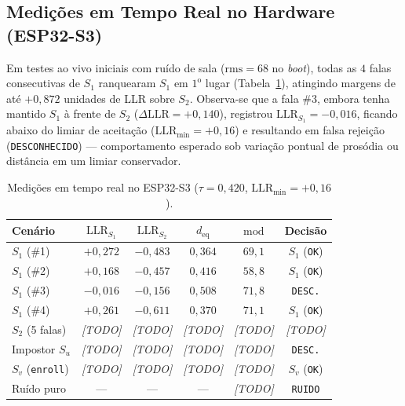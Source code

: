 \documentclass[9pt,technote,a4paper]{IEEEtran}
\begin{document}
\subsection{Medições em Tempo Real no Hardware (ESP32-S3)}
Em testes ao vivo iniciais com ruído de sala ($\mathrm{rms} = 68$ no \textit{boot}), todas as $4$ falas consecutivas de $S_1$ ranquearam $S_1$ em $1^\text{o}$ lugar (Tabela~\ref{tab:live_esp}), atingindo margens de até $+0{,}872$ unidades de LLR sobre $S_2$. Observa-se que a fala \#3, embora tenha mantido $S_1$ à frente de $S_2$ ($\Delta\mathrm{LLR} = +0{,}140$), registrou $\mathrm{LLR}_{S_1} = -0{,}016$, ficando abaixo do limiar de aceitação ($\mathrm{LLR}_{\min} = +0{,}16$) e resultando em falsa rejeição (\texttt{DESCONHECIDO}) --- comportamento esperado sob variação pontual de prosódia ou distância em um limiar conservador.

\begin{table}[t]
\centering
\scriptsize
\setlength{\tabcolsep}{2.8pt}
\caption{Medições em tempo real no ESP32-S3 ($\tau = 0{,}420$, $\mathrm{LLR}_{\min} = +0{,}16$).}
\label{tab:live_esp}
\begin{tabular}{lccccc}
\toprule
\textbf{Cenário} & \textbf{$\mathrm{LLR}_{S_1}$} & \textbf{$\mathrm{LLR}_{S_2}$} & \textbf{$d_{\mathrm{eq}}$} & \textbf{$\mathrm{mod}$} & \textbf{Decisão} \\
\midrule
$S_1$ (\#1) & $+0{,}272$ & $-0{,}483$ & $0{,}364$ & $69{,}1$ & $S_1$ (\texttt{OK}) \\
$S_1$ (\#2) & $+0{,}168$ & $-0{,}457$ & $0{,}416$ & $58{,}8$ & $S_1$ (\texttt{OK}) \\
$S_1$ (\#3) & $-0{,}016$ & $-0{,}156$ & $0{,}508$ & $71{,}8$ & \texttt{DESC.} \\
$S_1$ (\#4) & $+0{,}261$ & $-0{,}611$ & $0{,}370$ & $71{,}1$ & $S_1$ (\texttt{OK}) \\
\midrule
$S_2$ (5 falas) & \textit{[TODO]} & \textit{[TODO]} & \textit{[TODO]} & \textit{[TODO]} & \textit{[TODO]} \\
Impostor $S_u$ & \textit{[TODO]} & \textit{[TODO]} & \textit{[TODO]} & \textit{[TODO]} & \texttt{DESC.} \\
$S_v$ (\texttt{enroll}) & \textit{[TODO]} & \textit{[TODO]} & \textit{[TODO]} & \textit{[TODO]} & $S_v$ (\texttt{OK}) \\
Ruído puro & --- & --- & --- & \textit{[TODO]} & \texttt{RUIDO} \\
\bottomrule
\end{tabular}
\end{table}
\end{document}
